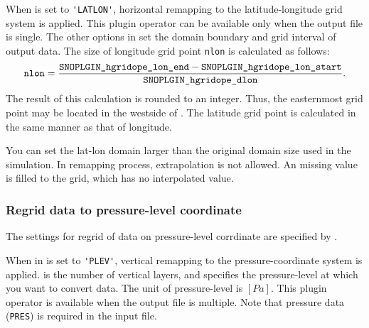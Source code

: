 When  is set to \verb|'LATLON'|, horizontal remapping to the latitude-longitude grid system is applied.
This plugin operator can be available only when the output file is single.
The other options in  set the domain boundary and grid interval of output data. The size of longitude grid point \verb|nlon| is calculated as follows:
\begin{eqnarray}
  \nmitemeq{nlon} = \frac{\nmitemeq{SNOPLGIN_hgridope_lon_end} - \nmitemeq{SNOPLGIN_hgridope_lon_start} }{\nmitemeq{SNOPLGIN_hgridope_dlon}} \nonumber.
\end{eqnarray}
\noindent
The result of this calculation is rounded to an integer. Thus, the easternmost grid point may be located in the westside of .
The latitude grid point is calculated in the same manner as that of longitude.

You can set the lat-lon domain larger than the original domain size used in the simulation. In remapping process, extrapolation is not allowed. An missing value is filled to the grid, which has no interpolated value.


\subsubsection{Regrid data to pressure-level coordinate}

The settings for regrid of data on pressure-level corrdinate are specified by .
%

When  in  is set to \verb|'PLEV'|, vertical remapping to the pressure-coordinate system is applied.
 is the number of vertical layers, and  specifies the pressure-level at which you want to convert data.
The unit of pressure-level is $[Pa]$.
This plugin operator is available when the output file is multiple.
Note that pressure data (\verb|PRES|) is required in the input file.
